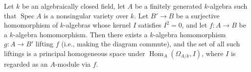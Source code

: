 Let $k$ be an algebraically closed field, let $A$ be a finitely generated $k$-algebra such that $\operatorname{Spec} A$ is a nonsingular variety over $k$. Let $B' \to B$ be a surjective homomorphism of $k$-algebras whose kernel $I$ satisfies $I^2 = 0$, and let $f: A \to B$ be a $k$-algebra homomorphism. Then there exists a $k$-algebra homomorphism $g: A \to B'$ lifting $f$ (i.e., making the diagram commute), and the set of all such liftings is a principal homogeneous space under $\operatorname{Hom}_A(\Omega_{A/k}, I)$, where $I$ is regarded as an $A$-module via $f$.
